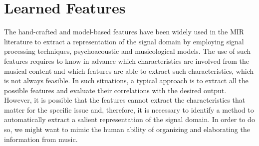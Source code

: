 %




\section{Learned Features}\label{sec:LLFs:learned}
The hand-crafted and model-based features have been widely used in the MIR literature to extract a representation of the signal domain by employing signal processing techniques, psychoacoustic and musicological models. The use of such features requires to know in advance which characteristics are involved from the musical content and which features are able to extract such characteristics, which is not always feasible. In such situations, a typical approach is to extract all the possible features and evaluate their correlations with the desired output. However, it is possible that the features cannot extract the characteristics that matter for the specific issue and, therefore, it is necessary to identify a method to automatically extract a salient representation of the signal domain. In order to do so, we might want to mimic the human ability of organizing and elaborating the information from music.

